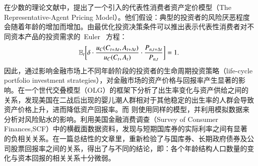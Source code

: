 在少数的理论文献中，提出了一个引入\dsf 的代表性消费者资产定价模型（The Representative-Agent Pricing Model）。他们假设：典型的投资者的风险厌恶程度会随着年龄的增加而增加。由最优化投资决策条件可以推出表示代表性消费者对不同资本产品的投资需求的~Euler~ 方程：
 \begin{align}
   \mathbb{E}_t \bigg[\delta \cdot \frac{u_C(C_{t+\Delta t}, A_{t+\Delta t})}  {u_C(C_t,A_t)} \cdot \frac{P_{n,t+\Delta t}}{P_{n,t}} \bigg] =1.
 \end{align}
因此，通过影响金融市场上不同年龄阶段的投资者的生命周期投资策略（life-cycle portfolio investment strategies），\dsf 对金融市场的资产价格与回报率产生显著的影响。在一个世代交叠模型（OLG）的框架下分析了出生率变化与资产供给之间的关系，发现美国在二战后出现的婴儿潮人群相对于其他稳定的出生率的人群会导致资产价格上升，进而降低资产回报率。而 则使用同样的模型，并利用模拟数据来分析\dsf 对风险贴水的影响。利用美国金融消费调查（Survey of Consumer Finances,SCF）中的横截面数据资料，发现\dsf 与短期国库券的实际利率之间有显著的负相关关系。在一篇总结性的文章里，重新检验了\dsf 与国库券、长期政府债券及公司股票回报率之间的关系，得出了与不同的结论，即：各个年龄结构人口数量的变化与资本回报的相关关系十分微弱。

